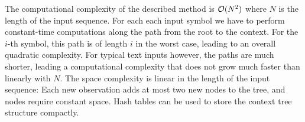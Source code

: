 The computational complexity of the described method is $\Oh(N^2)$ where $N$
is the length of the input sequence. For each each input symbol we have to
perform constant-time computations along the path from the root to the
context. For the $i$-th symbol, this path is of length $i$ in the worst case,
leading to an overall quadratic complexity. For typical text inputs however,
the paths are much shorter, leading a computational complexity that does not
grow much faster than linearly with $N$. The space complexity is linear in the
length of the input sequence: Each new observation adds at most two new nodes
to the tree, and nodes require constant space. Hash tables can be used to
store the context tree structure compactly.
